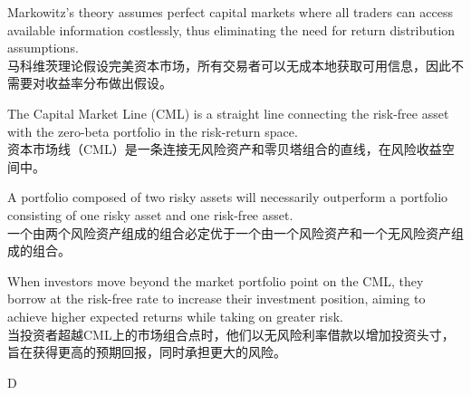 \documentclass{article}
\begin{document}
\begin{choices}
    \item Markowitz's theory assumes perfect capital markets where all traders can access available information costlessly, thus eliminating the need for return distribution assumptions.
    \\
    马科维茨理论假设完美资本市场，所有交易者可以无成本地获取可用信息，因此不需要对收益率分布做出假设。
    \item The Capital Market Line (CML) is a straight line connecting the risk-free asset with the zero-beta portfolio in the risk-return space.
    \\
    资本市场线（CML）是一条连接无风险资产和零贝塔组合的直线，在风险收益空间中。
    \item A portfolio composed of two risky assets will necessarily outperform a portfolio consisting of one risky asset and one risk-free asset.
    \\
    一个由两个风险资产组成的组合必定优于一个由一个风险资产和一个无风险资产组成的组合。
    \item When investors move beyond the market portfolio point on the CML, they borrow at the risk-free rate to increase their investment position, aiming to achieve higher expected returns while taking on greater risk.
    \\
    当投资者超越CML上的市场组合点时，他们以无风险利率借款以增加投资头寸，旨在获得更高的预期回报，同时承担更大的风险。
\end{choices}

\begin{correctanswer}
    D
\end{correctanswer}
\end{document}
